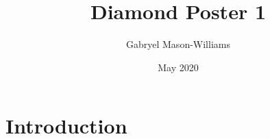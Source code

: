 \documentclass{article}
\title{Diamond Poster 1}
\author{Gabryel Mason-Williams}
\date{May 2020}
\begin{document}
\maketitle

\section{Introduction}
\end{document}
